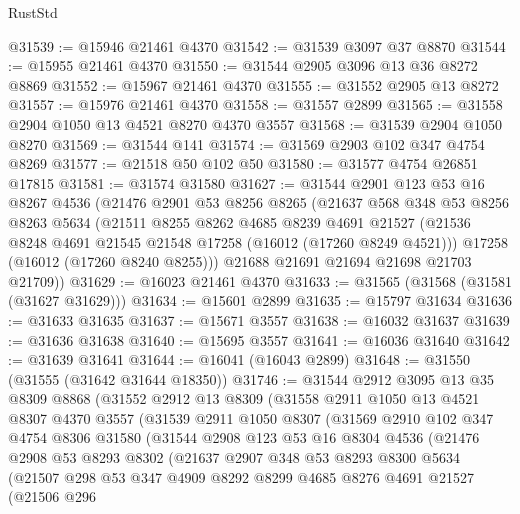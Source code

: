\begin{lexlean}{RustStd}
\begin{coremodule}
@31539 := @15946 @21461 @4370
@31542 := @31539 @3097 @37 @8870
@31544 := @15955 @21461 @4370
@31550 := @31544 @2905 @3096 @13 @36 @8272 @8869
@31552 := @15967 @21461 @4370
@31555 := @31552 @2905 @13 @8272
@31557 := @15976 @21461 @4370
@31558 := @31557 @2899
@31565 := @31558 @2904 @1050 @13 @4521 @8270 @4370 @3557
@31568 := @31539 @2904 @1050 @8270
@31569 := @31544 @141
@31574 := @31569 @2903 @102 @347 @4754 @8269
@31577 := @21518 @50 @102 @50
@31580 := @31577 @4754 @26851 @17815
@31581 := @31574 @31580
@31627 := @31544
    @2901
    @123
    @53
    @16
    @8267
    @4536
    (@21476
      @2901
      @53
      @8256
      @8265
      (@21637
        @568
        @348
        @53
        @8256
        @8263
        @5634
        (@21511
          @8255
          @8262
          @4685
          @8239
          @4691
          @21527
          (@21536 @8248 @4691 @21545 @21548 @17258 (@16012 (@17260 @8249 @4521)))
          @17258
          (@16012 (@17260 @8240 @8255)))
        @21688
        @21691
        @21694
        @21698
        @21703
        @21709))
@31629 := @16023 @21461 @4370
@31633 := @31565 (@31568 (@31581 (@31627 @31629)))
@31634 := @15601 @2899
@31635 := @15797 @31634
@31636 := @31633 @31635
@31637 := @15671 @3557
@31638 := @16032 @31637
@31639 := @31636 @31638
@31640 := @15695 @3557
@31641 := @16036 @31640
@31642 := @31639 @31641
@31644 := @16041 (@16043 @2899)
@31648 := @31550 (@31555 (@31642 @31644 @18350))
@31746 := @31544
    @2912
    @3095
    @13
    @35
    @8309
    @8868
    (@31552
      @2912
      @13
      @8309
      (@31558
        @2911
        @1050
        @13
        @4521
        @8307
        @4370
        @3557
        (@31539
          @2911
          @1050
          @8307
          (@31569
            @2910
            @102
            @347
            @4754
            @8306
            @31580
            (@31544
              @2908
              @123
              @53
              @16
              @8304
              @4536
              (@21476
                @2908
                @53
                @8293
                @8302
                (@21637
                  @2907
                  @348
                  @53
                  @8293
                  @8300
                  @5634
                  (@21507
                    @298
                    @53
                    @347
                    @4909
                    @8292
                    @8299
                    @4685
                    @8276
                    @4691
                    @21527
                    (@21506
                      @296

\end{coremodule}
\end{lexlean}

